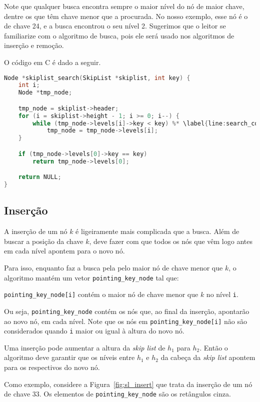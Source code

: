 \documentclass[paper=a4, fontsize=11pt]{scrartcl} %
\numberwithin{equation}{section}
\numberwithin{figure}{section}
\numberwithin{table}{section}
\numberwithin{definition}{section}
\numberwithin{theorem}{section}
\numberwithin{property}{section}
\numberwithin{proposition}{section}
\renewcommand{\sl}{\textit{skip list}\xspace}
\begin{document}
Note que qualquer busca encontra sempre o maior nível do nó de maior chave, dentre os que têm chave menor que a
procurada. No nosso exemplo, esse nó é o de chave 24, e a busca encontrou o seu nível 2. Sugerimos que o leitor
se familiarize com o algoritmo de busca, pois ele será usado nos algoritmos de inserção e remoção.

O código em C é dado a seguir.
\begin{lstlisting}[caption=Busca., language=C]
Node *skiplist_search(SkipList *skiplist, int key) {
    int i;
    Node *tmp_node;

    tmp_node = skiplist->header;
    for (i = skiplist->height - 1; i >= 0; i--) {
        while (tmp_node->levels[i]->key < key) %* \label{line:search_cost} *)
            tmp_node = tmp_node->levels[i];
    }

    if (tmp_node->levels[0]->key == key)
        return tmp_node->levels[0];

    return NULL;
}
\end{lstlisting} \FloatBarrier

\subsection{Inserção} \label{sec:ins}

A inserção de um nó $k$ é ligeiramente mais complicada que a busca. Além de buscar a posição da chave $k$, deve
fazer com que todos os nós que vêm logo antes em cada nível apontem para o novo nó.

Para isso, enquanto faz a busca pela pelo maior nó de chave menor que $k$, o algoritmo mantém um vetor 
\verb|pointing_key_node| tal que:

\begin{center}
\verb|pointing_key_node[i]| contém o maior nó de chave menor que $k$ no nível \verb|i|.
\end{center}

Ou seja, \verb|pointing_key_node| contém os nós que, ao final da inserção, apontarão ao novo nó, em cada nível.
Note que os nós em \verb|pointing_key_node[i]| não são considerados quando 
\verb|i| maior ou igual à altura do novo nó.

Uma inserção pode aumentar a altura da \sl de $h_1$ para $h_2$. Então o algoritmo deve garantir que os níveis
entre $h_1$ e $h_2$ da cabeça da \sl apontem para os respectivos do novo nó.

Como exemplo, considere a Figura~\ref{fig:sl_insert} que trata da inserção de um nó de chave $33$. Os elementos
de \verb|pointing_key_node| são os retângulos cinza.
\end{document}
